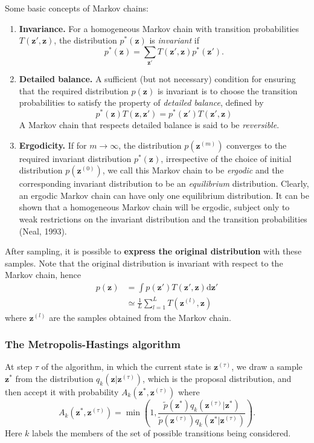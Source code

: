 \documentclass[a4paper]{report}
\newcommand{\ud}{\mathrm{d}}
\renewcommand{\bf}{\mathbf}
\newcommand{\imp}[1]{{\color{blue}\textit{#1}}}
\begin{document}
Some basic concepts of Markov chains:
\begin{enumerate}
	\item \textbf{Invariance.} For a homogeneous Markov chain with transition probabilities $T(\bf{z}',\bf{z})$, the distribution $p^*(\bf{z})$ is \imp{invariant} if
	\begin{equation}
		p^*(\bf{z}) = \sum_{\bf{z}'} T(\bf{z}',\bf{z})p^*(\bf{z'}).
	\end{equation}
	\item \textbf{Detailed balance.} A sufficient (but not necessary) condition for ensuring that the required distribution $p(\bf{z})$ is invariant is to choose the transition probabilities to satisfy the property of \imp{detailed balance}, defined by
	\begin{equation}
		p^*(\bf{z})T(\bf{z,z'}) = p^*(\bf{z'})T(\bf{z',z})
	\end{equation}
	A Markov chain that respects detailed balance is said to be \imp{reversible}.
	\item \textbf{Ergodicity.} If for $m \rightarrow \infty$, the distribution $p(\bf{z}^{(m)})$ converges to the required invariant distribution $p^*(\bf{z})$, irrespective of the choice of initial distribution $p(\bf{z}^{(0)})$, we call this Markov chain to be \imp{ergodic} and the corresponding invariant distribution to be an \imp{equilibrium} distribution. Clearly, an ergodic Markov chain can have only one equilibrium distribution. It can be shown that a homogeneous Markov chain will be ergodic, subject only to weak restrictions on the invariant distribution and the transition probabilities (Neal, 1993).
\end{enumerate}

After sampling, it is possible to \textbf{express the original distribution} with these samples. Note that the original distribution is invariant with respect to the Markov chain, hence
\begin{align}
	p(\bf{z}) &= \int p(\bf{z'}) T(\bf{z'},\bf{z}) \ud \bf{z}' \\
	&\simeq \frac{1}{L} \sum_{l=1}^L T(\bf{z}^{(l)},\bf{z})
\end{align}
where $\bf{z}^{(l)}$ are the samples obtained from the Markov chain.


\subsubsection{The Metropolis-Hastings algorithm}
At step $\tau$ of the algorithm, in which the current state is $\bf{z}^{(\tau)}$, we draw a sample $\bf{z}^*$ from the distribution $q_k(\bf{z}|\bf{z}^{(\tau)})$, which is the proposal distribution, and then accept it with probability $A_k(\bf{z}^*,\bf{z}^{(\tau)})$ where
\begin{equation}
	A_k(\bf{z}^*,\bf{z}^{(\tau)}) = \min \left(  1, \frac{\tilde{p}(\bf{z}^*) q_k(\bf{z}^{(\tau)}|\bf{z}^*)}{\tilde{p}(\bf{z}^{(\tau)})q_k(\bf{z}^*|\bf{z}^{(\tau)})} \right).
\end{equation}
Here $k$ labels the members of the set of possible transitions being considered.
\end{document}
